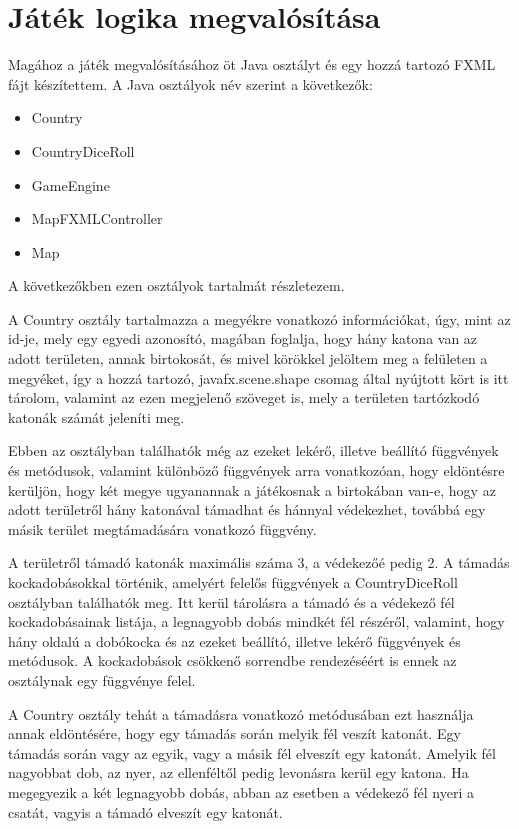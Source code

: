 \section{Játék logika megvalósítása}

Magához a játék megvalósításához öt Java osztályt és egy hozzá tartozó FXML fájt készítettem. A Java osztályok név szerint a következők: 

\begin{itemize}
\item Country 
\item CountryDiceRoll 
\item GameEngine 
\item MapFXMLController 
\item Map 
\end{itemize}

A következőkben ezen osztályok tartalmát részletezem. 

A Country osztály tartalmazza a megyékre vonatkozó információkat, úgy, mint az id-je, mely egy egyedi azonosító, magában foglalja, hogy hány katona van az adott területen, annak birtokosát, és mivel körökkel jelöltem meg a felületen a megyéket, így a hozzá tartozó, javafx.scene.shape csomag által nyújtott kört is itt tárolom, valamint az ezen megjelenő szöveget is, mely a területen tartózkodó katonák számát jeleníti meg. 

Ebben az osztályban találhatók még az ezeket lekérő, illetve beállító függvények és metódusok, valamint különböző függvények arra vonatkozóan, hogy eldöntésre kerüljön, hogy két megye ugyanannak a játékosnak a birtokában van-e, hogy az adott területről hány katonával támadhat és hánnyal védekezhet, továbbá egy másik terület megtámadására vonatkozó függvény. 

A területről támadó katonák maximális száma 3, a védekezőé pedig 2. A támadás kockadobásokkal történik, amelyért felelős függvények a CountryDiceRoll osztályban találhatók meg. Itt kerül tárolásra a támadó és a védekező fél kockadobásainak listája, a legnagyobb dobás mindkét fél részéről, valamint, hogy hány oldalú a dobókocka és az ezeket beállító, illetve lekérő függvények és metódusok. A kockadobások csökkenő sorrendbe rendezéséért is ennek az osztálynak egy függvénye felel. 

A Country osztály tehát a támadásra vonatkozó metódusában ezt használja annak eldöntésére, hogy egy támadás során melyik fél veszít katonát. Egy támadás során vagy az egyik, vagy a másik fél elveszít egy katonát. Amelyik fél nagyobbat dob, az nyer, az ellenféltől pedig levonásra kerül egy katona. Ha megegyezik a két legnagyobb dobás, abban az esetben a védekező fél nyeri a csatát, vagyis a támadó elveszít egy katonát. 

